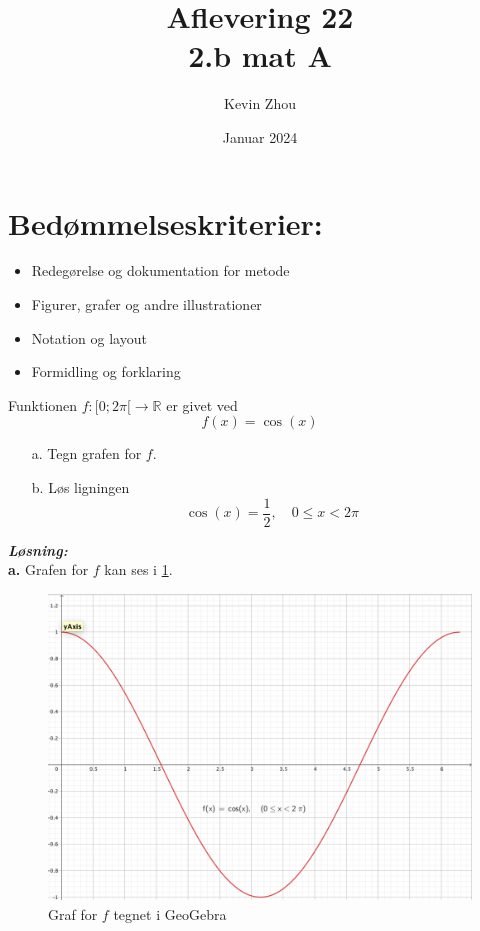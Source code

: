 \documentclass{article}
\title{Aflevering 22\\
{\Large \textbf{2.b mat A}}}
\author{Kevin Zhou}
\date{Januar 2024}
\newcommand{\sol}{\setlength{\parindent}{0cm}\textbf{\textit{Løsning:}}\setlength{\parindent}{1cm}}
\begin{document}
\maketitle
\section*{Bedømmelseskriterier:}
\begin{itemize}
    \setlength\itemsep{3cm}
    \Large
    \item  Redegørelse og dokumentation for metode
    \item Figurer, grafer og andre illustrationer
    \item Notation og layout
    \item Formidling og forklaring
\end{itemize}
\pagebreak
\begin{question}{}{}
  Funktionen $f:[0;2\pi[ \to \mathbb{R}$ er givet ved
\[
  f(x)= \cos(x)
\] 
\begin{itemize}
  \item[a.] Tegn grafen for $f$.
  \item[b.] Løs ligningen
  \[
  \cos(x)=\frac{1}{2}, \quad 0\leq x < 2\pi
  \] 
\end{itemize}
\end{question}
\sol \\ 
\textbf{a.}
Grafen for $f$ kan ses i \cref{fig:cos}. 
\begin{figure}[H]
\begin{center}
  \includegraphics[width=\textwidth]{graf1.png}
\end{center}
\caption{Graf for $f$ tegnet i GeoGebra }
\label{fig:cos}
\end{figure}
\end{document}
